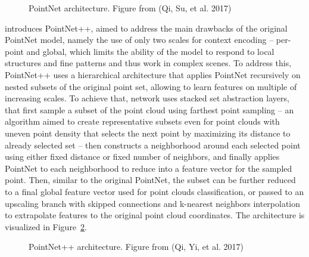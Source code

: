 \begin{figure}
\caption{\label{fig-pointnet-architecture}PointNet architecture. Figure
from (Qi, Su, et al. 2017)}
\end{figure}

\citet{qiPointNetPlusPlus2017} introduces PointNet++, aimed to address the main drawbacks of the original PointNet model, namely the use of only two scales for context encoding – per-point and global, which limits the ability of the model to respond to local structures and fine patterns and thus work in complex scenes.
To address this, PointNet++ uses a hierarchical architecture that applies PointNet recursively on nested subsets of the original point set, allowing to learn features on multiple of increasing scales.
To achieve that, network uses stacked set abstraction layers, that first sample a subset of the point cloud using farthest point sampling – an algorithm aimed to create representative subsets even for point clouds with uneven point density that selects the next point by maximizing its distance to already selected set – then constructs a neighborhood around each selected point using either fixed distance or fixed number of neighbors, and finally applies PointNet to each neighborhood to reduce into a feature vector for the sampled point.
Then, similar to the original PointNet, the subset can be further reduced to a final global feature vector used for point clouds classification, or passed to an upscaling branch with skipped connections and k-nearest neighbors interpolation to extrapolate features to the original point cloud coordinates.
The architecture is visualized in Figure~\ref{fig-pointnet2-architecture}.

\begin{figure}
\caption{\label{fig-pointnet2-architecture}PointNet++ architecture.
Figure from (Qi, Yi, et al. 2017)}
\end{figure}


